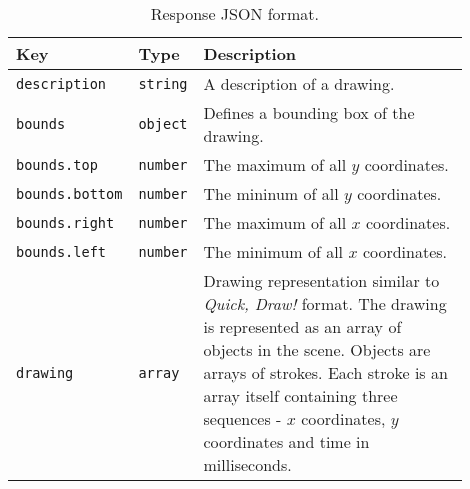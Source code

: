 \begin{table}[ht]
    \small
    \centering
    \begin{tabular}{p{0.2\linewidth}|p{0.1\linewidth}|p{0.6\linewidth}}
        \textbf{Key} & \textbf{Type} & \textbf{Description} \\
        \hline \hline
        \verb|description| & \verb|string| & A description of a drawing. \\
        \hline
        \verb|bounds| & \verb|object| & Defines a bounding box of the drawing. \\
        \hline
        \verb|bounds.top| & \verb|number| & The maximum of all $y$ coordinates. \\
        \hline
        \verb|bounds.bottom| & \verb|number| & The mininum of all $y$ coordinates.  \\
        \hline
        \verb|bounds.right| & \verb|number| & The maximum of all $x$ coordinates. \\
        \hline
        \verb|bounds.left| & \verb|number| & The minimum of all $x$ coordinates. \\
        \hline
        \verb|drawing| & \verb|array| & Drawing representation similar to \emph{Quick, Draw!} format. The drawing is represented as an array of objects in the scene. Objects are arrays of strokes. Each stroke is an array itself containing three sequences - $x$ coordinates, $y$ coordinates and time in milliseconds. \\
    \end{tabular}
    \caption[Response JSON format]{Response JSON format.}
    \label{tab:api_response}
\end{table}